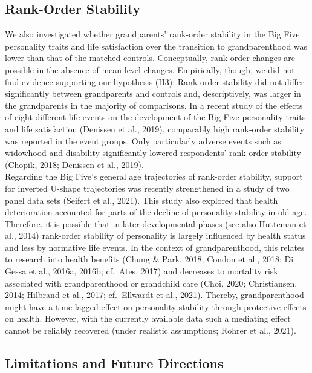 \documentclass[
  english,
  man, noextraspace]{apa7}
\begin{document}
\hypertarget{rank-order-stability-1}{%
\subsection{Rank-Order Stability}\label{rank-order-stability-1}}

We also investigated whether grandparents' rank-order stability in the Big Five personality traits and life satisfaction over the transition to grandparenthood was lower than that of the matched controls. Conceptually, rank-order changes are possible in the absence of mean-level changes. Empirically, though, we did not find evidence supporting our hypothesis (H3): Rank-order stability did not differ significantly between grandparents and controls and, descriptively, was larger in the grandparents in the majority of comparisons. In a recent study of the effects of eight different life events on the development of the Big Five personality traits and life satisfaction (Denissen et al., 2019), comparably high rank-order stability was reported in the event groups. Only particularly adverse events such as widowhood and disability significantly lowered respondents' rank-order stability (Chopik, 2018; Denissen et al., 2019).\\
Regarding the Big Five's general age trajectories of rank-order stability, support for inverted U-shape trajectories was recently strengthened in a study of two panel data sets (Seifert et al., 2021). This study also explored that health deterioration accounted for parts of the decline of personality stability in old age. Therefore, it is possible that in later developmental phases (see also Hutteman et al., 2014) rank-order stability of personality is largely influenced by health status and less by normative life events. In the context of grandparenthood, this relates to research into health benefits (Chung \& Park, 2018; Condon et al., 2018; Di Gessa et al., 2016a, 2016b; cf.~Ates, 2017) and decreases to mortality risk associated with grandparenthood or grandchild care (Choi, 2020; Christiansen, 2014; Hilbrand et al., 2017; cf.~Ellwardt et al., 2021). Thereby, grandparenthood might have a time-lagged effect on personality stability through protective effects on health. However, with the currently available data such a mediating effect cannot be reliably recovered (under realistic assumptions; Rohrer et al., 2021).

\hypertarget{limitations-and-future-directions}{%
\subsection{Limitations and Future Directions}\label{limitations-and-future-directions}}
\end{document}
